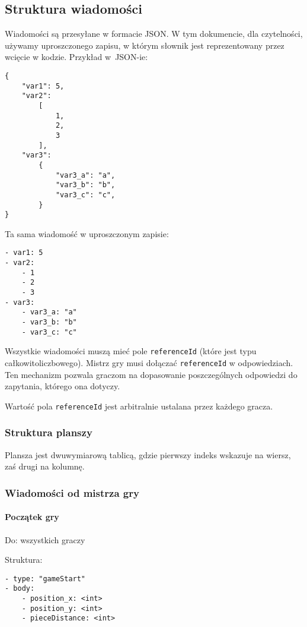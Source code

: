 \documentclass[a4paper]{article}
\newcommand{\code}{\texttt}
\begin{document}
\subsection{Struktura wiadomości}

Wiadomości są przesyłane w formacie JSON.
W tym dokumencie, dla czytelności, używamy uproszczonego zapisu, w którym słownik jest reprezentowany przez wcięcie w kodzie.
Przykład w~JSON-ie:

\begin{verbatim}
{
    "var1": 5,
    "var2":
        [
            1,
            2,
            3
        ],
    "var3":
        {
            "var3_a": "a",
            "var3_b": "b",
            "var3_c": "c",
        }
}
\end{verbatim}

Ta sama wiadomość w uproszczonym zapisie:

\begin{verbatim}
- var1: 5
- var2:
    - 1
    - 2
    - 3
- var3:
    - var3_a: "a"
    - var3_b: "b"
    - var3_c: "c"
\end{verbatim}

Wszystkie wiadomości muszą mieć pole \code{referenceId} (które jest typu całkowitoliczbowego).
Mistrz gry musi dołączać \code{referenceId} w odpowiedziach.
Ten mechanizm pozwala graczom na dopasowanie poszczególnych odpowiedzi do zapytania, którego ona dotyczy.

Wartość pola \code{referenceId} jest arbitralnie ustalana przez każdego gracza.

\subsubsection{Struktura planszy}

Plansza jest dwuwymiarową tablicą, gdzie pierwszy indeks wskazuje na wiersz, zaś drugi na kolumnę.

\subsubsection{Wiadomości od mistrza gry}

\paragraph{Początek gry}
\hfill
\hfill

Do: wszystkich graczy

Struktura:

\begin{verbatim}
- type: "gameStart"
- body:
    - position_x: <int>
    - position_y: <int>
    - pieceDistance: <int>
\end{verbatim}
\end{document}
